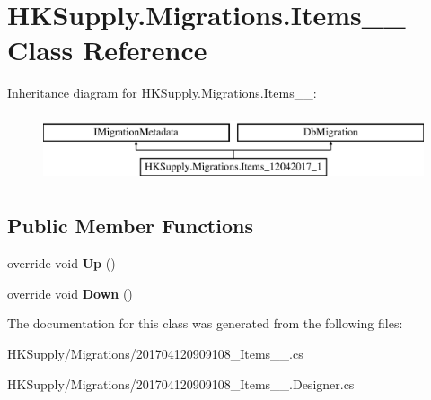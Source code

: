 \hypertarget{class_h_k_supply_1_1_migrations_1_1_items__12042017__1}{}\section{H\+K\+Supply.\+Migrations.\+Items\+\_\+\_ Class Reference}
\label{class_h_k_supply_1_1_migrations_1_1_items__12042017__1}
Inheritance diagram for H\+K\+Supply.\+Migrations.\+Items\+\_\+\_\+:\begin{figure}[H]
\begin{center}
\leavevmode
\includegraphics[height=2.000000cm]{class_h_k_supply_1_1_migrations_1_1_items__12042017__1}
\end{center}
\end{figure}
\subsection*{Public Member Functions}
\begin{DoxyCompactItemize}
\item 
\mbox{\label{class_h_k_supply_1_1_migrations_1_1_items__12042017__1_a0ae304c8296eefab34d7634970bb3352}} 
override void {\bfseries Up} ()
\item 
\mbox{\label{class_h_k_supply_1_1_migrations_1_1_items__12042017__1_a277087a244b08b9504b53384602f8cd1}} 
override void {\bfseries Down} ()
\end{DoxyCompactItemize}


The documentation for this class was generated from the following files\+:\begin{DoxyCompactItemize}
\item 
H\+K\+Supply/\+Migrations/201704120909108\+\_\+\+Items\+\_\+\_.\+cs\item 
H\+K\+Supply/\+Migrations/201704120909108\+\_\+\+Items\+\_\+\_.\+Designer.\+cs\end{DoxyCompactItemize}
